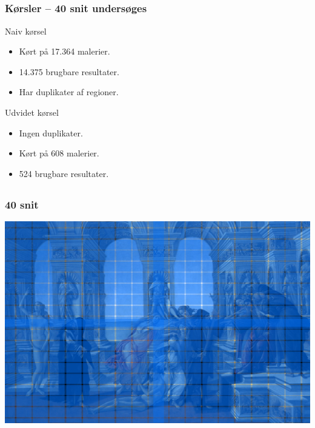 \documentclass[xcolor=table]{beamer}
\begin{document}
\subsection*{}
\begin{frame}

    \frametitle{Kørsler -- 40 snit undersøges}

    \begin{block}{Naiv kørsel}
        \begin{itemize}
            \item Kørt på 17.364 malerier.
            \item 14.375 brugbare resultater.
            \item \alert{Har duplikater af regioner.}
        \end{itemize}
    \end{block}

    \begin{block}{Udvidet kørsel}
        \begin{itemize}
            \item Ingen duplikater.
            \item Kørt på 608 malerier.
            \item \alert{524 brugbare resultater.}
        \end{itemize}
    \end{block}

\end{frame}

\subsection*{}
\begin{frame}

    \frametitle{40 snit}

    \begin{center}
        \includegraphics[width=1.00\textwidth]{billeder/koersel_snit}
    \end{center}

\end{frame}
\end{document}
